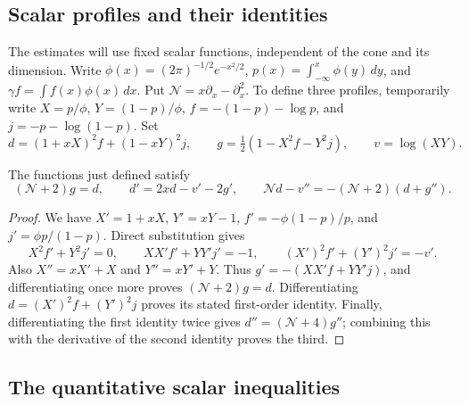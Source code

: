 \subsection{Scalar profiles and their identities}
The estimates will use fixed scalar functions, independent of the cone and its dimension. Write \(\phi(x)=(2\pi)^{-1/2}e^{-x^2/2}\), \(p(x)=\int_{-\infty}^x\phi(y)\,dy\), and \(\gamma f=\int f(x)\phi(x)\,dx\). Put \(\mathcal N=x\partial_x-\partial_x^2\). To define three profiles, temporarily write \(X=p/\phi\), \(Y=(1-p)/\phi\), \(f=-(1-p)-\log p\), and \(j=-p-\log(1-p)\). Set
\[
 d=(1+xX)^2 f+(1-xY)^2 j,\qquad
 g=\tfrac12(1-X^2 f-Y^2 j),\qquad v=\log(XY).
\]
\begin{lemma}\label{lem:profile-identities}
The functions just defined satisfy
\[
 (\mathcal N+2)g=d,\qquad d'=2xd-v'-2g',\qquad
 \mathcal N d-v''=-(\mathcal N+2)(d+g'').                          \tag{2}\label{eq:2}
\]
\end{lemma}
\begin{proof}
We have \(X'=1+xX\), \(Y'=xY-1\), \(f'=-\phi(1-p)/p\), and \(j'=\phi p/(1-p)\). Direct substitution gives
\[
X^2f'+Y^2j'=0,\qquad XX'f'+YY'j'=-1,\qquad
(X')^2f'+(Y')^2j'=-v'.
\]
Also \(X''=xX'+X\) and \(Y''=xY'+Y\). Thus
\(g'=-(XX'f+YY'j)\), and differentiating once more proves \((\mathcal N+2)g=d\). Differentiating \(d=(X')^2f+(Y')^2j\) proves its stated first-order identity. Finally, differentiating the first identity twice gives \(d''=(\mathcal N+4)g''\); combining this with the derivative of the second identity proves the third.
\end{proof}

\subsection{The quantitative scalar inequalities}

